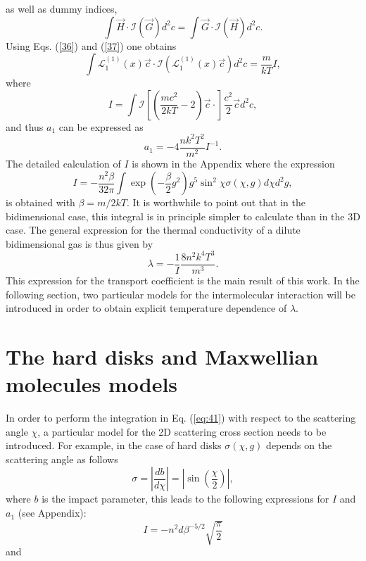 \documentclass[11pt]{article} %
\begin{document}
as well as dummy indices, 
\begin{equation}
\int\vec{H}\cdot\mathcal{I}\left(\vec{G}\right)d^{2}c=\int\vec{G}\cdot\mathcal{I}\left(\vec{H}\right)d^{2}c.\label{37}
\end{equation}
Using Eqs. (\ref{36}) and (\ref{37}) one obtains 
\begin{equation}
\int\mathcal{L}_{1}^{\left(1\right)}\left(x\right)\vec{c}\cdot\mathcal{I}\left(\mathcal{L}_{1}^{\left(1\right)}\left(x\right)\vec{c}\right)d^{2}c=\frac{m}{kT}I,\label{38-1}
\end{equation}
where 
\begin{equation}
I=\int\mathcal{I}\left[\left(\frac{mc^{2}}{2kT}-2\right)\vec{c}\cdot\right]\frac{c^{2}}{2}\vec{c}d^{2}c,\label{39}
\end{equation}
and thus $a_{1}$ can be expressed as 
\begin{equation}
a_{1}=-4\frac{nk^{2}T^{2}}{m^{2}}I^{-1}.\label{40}
\end{equation}
The detailed calculation of $I$ is shown in the Appendix where the
expression 
\begin{equation}
I=-\frac{n^{2}\beta}{32\pi}\int\exp\left(-\frac{\beta}{2}g^{2}\right)g^{5}\sin^{2}\chi\sigma\left(\chi,g\right)d\chi d^{2}g,\label{eq:41}
\end{equation}
is obtained with $\beta=m/2kT$. It is worthwhile to point out that
in the bidimensional case, this integral is in principle simpler
to calculate than in the 3D case. The general expression for
the thermal conductivity of a dilute bidimensional gas is thus given
by 
\begin{equation}
\lambda=-\frac{1}{I}\frac{8n^{2}k^{4}T^{3}}{m^{3}}.\label{eq:45}
\end{equation}
This expression for the transport coefficient is the main result of
this work. In the following section, two particular models for the
intermolecular interaction will be introduced in order to obtain explicit
temperature dependence of $\lambda$.


\section{The hard disks and Maxwellian molecules models}

In order to perform the integration in Eq. (\ref{eq:41}) with respect
to the scattering angle $\chi$, a particular model for the 2D scattering cross section 
needs to be introduced. For example, in the case of
hard disks $\sigma\left(\chi,g\right)$ depends on the scattering
angle as follows 
\begin{equation}
\sigma=\left|\frac{db}{d\chi}\right|=\left|\sin\left(\frac{\chi}{2}\right)\right|,
\end{equation}
where $b$ is the impact parameter, this leads to the following expressions for $I$ and $a_{1}$ (see
Appendix): 
\begin{equation}
I=-n^{2}d\beta^{-5/2}\sqrt{\frac{\pi}{2}}\label{eq:42}
\end{equation}
and
\end{document}
